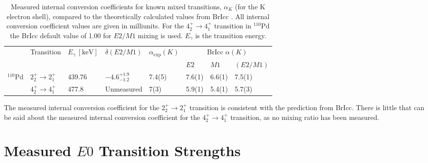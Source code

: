 \begin{table}
  \begin{center}
    \begin{tabular}{|l|l l|l|l|l l l|} 
     \hline
     & Transition & $E_\gamma \ [\mathrm{keV}]$ &$\delta(E2/M1)$& $\alpha_\mathrm{exp}(K)$ & \multicolumn{3}{c|}{BrIcc $\alpha(K)$} \\
     &  \multicolumn{2}{c|}{}	& 		& 			& $E2$		& $M1$		& $(E2/M1)$	\\  
     \hline 
     $^{110}\mathrm{Pd}$	& $2_2^+ \rightarrow 2_1^+$ & 439.76 & $-4.6^{+1.9}_{-1.2}$	& 7.4(5)	& 7.6(1) 	& 6.6(1)	& 7.5(1)	\\  
                         	& $4_2^+ \rightarrow 4_1^+$ & 477.8  & Unmeasured			& 7(3)		& 5.9(1) 	& 5.4(1)	& 5.7(3)	\\   
     \hline
    \end{tabular}
  \end{center}
  \caption[Measured internal conversion coefficients for known mixed transitions, $\alpha_K$ (for the K electron shell), compared to the theoretically calculated values from BrIcc \cite{KIBEDI2008202}.]{Measured internal conversion coefficients for known mixed transitions, $\alpha_K$ (for the K electron shell), compared to the theoretically calculated values from BrIcc \cite{KIBEDI2008202}. All internal conversion coefficient values are given in milliunits. For the $4_2^+ \rightarrow 4_1^+$ transition in $^{110}\mathrm{Pd}$ the BrIcc default value of 1.00 for $E2/M1$ mixing is used. $E_\gamma$ is the transition energy.}
  \label{table:measured_mixed_ICC}
\end{table}

The measured internal conversion coefficient for the $2_2^+ \rightarrow 2_1^+$ transition is consistent with the prediction from BrIcc. There is little that can be said about the measured internal conversion coefficient for the $4_2^+ \rightarrow 4_1^+$ transition, as no mixing ratio has been measured. 

\section{Measured $E0$ Transition Strengths}
\label{sec: Measured E0 Transition Strengths}

